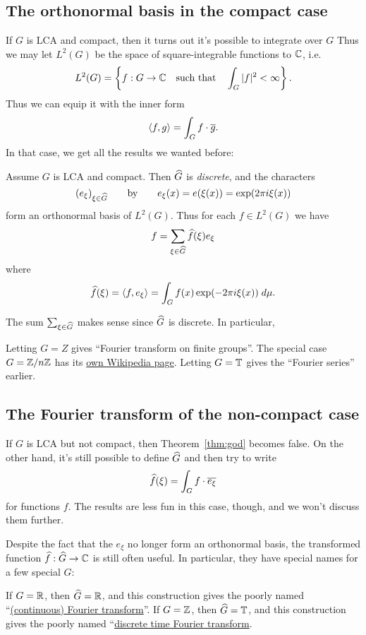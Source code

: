 \subsection{The orthonormal basis in the compact case}
If $G$ is LCA and compact,
then it turns out it's possible to integrate over $G$
Thus we may let $L^2(G)$ be the space of square-integrable functions to $\mathbb C$, i.e.
\[ L^2(G) = \left\{ f : G \to \mathbb C
	\quad\text{such that}\quad \int_G |f|^2 < \infty \right\}. \]
Thus we can equip it with the inner form
\[ \left< f,g \right> = \int_G f \cdot \overline{g}. \]
In that case, we get all the results we wanted before:
\begin{theorem}
	\label{thm:god}
	Assume $G$ is LCA and compact.
	Then $\widehat G$ is \emph{discrete}, and the characters
	\[ (e_\xi)_{\xi \in \widehat G}
		\qquad\text{by}\qquad e_\xi(x) = e(\xi(x)) = \exp(2\pi i \xi(x)) \]
	form an orthonormal basis of $L^2(G)$.
	Thus for each $f \in L^2(G)$ we have
	\[ f = \sum_{\xi \in \widehat G} \widehat f(\xi) e_\xi \]
	where
	\[ \widehat f(\xi) = \left< f, e_\xi \right>
		= \int_G f(x) \exp(-2\pi i \xi(x)) \; d\mu. \]
\end{theorem}
The sum $\sum_{\xi \in \widehat G}$ makes sense since $\widehat G$ is discrete.
In particular,
\begin{itemize}
	\ii Letting $G = Z$ gives ``Fourier transform on finite groups''.
	\ii The special case $G = \mathbb Z/n\mathbb Z$ has its
	\href{https://en.wikipedia.org/wiki/Discrete-time_Fourier_transform}%
	{own Wikipedia page}.
	\ii Letting $G = \mathbb T$ gives the ``Fourier series'' earlier.
\end{itemize}

\subsection{The Fourier transform of the non-compact case}
If $G$ is LCA but not compact, then Theorem~\ref{thm:god} becomes false.
On the other hand, it's still possible to define $\widehat G$
and then try to write
\[ \widehat f(\xi) = \int_G f \cdot \overline{e_\xi} \]
for functions $f$.
The results are less fun in this case,
though, and we won't discuss them further.

Despite the fact that the $e_\xi$ no longer form an orthonormal basis,
the transformed function $\widehat f : \widehat G \to \mathbb C$ is still often useful.
In particular, they have special names for a few special $G$:
\begin{itemize}
	\ii If $G = \mathbb R$, then $\widehat G = \mathbb R$,
	and this construction gives the poorly named
	``\href{https://en.wikipedia.org/wiki/Fourier_transform}{(continuous) Fourier transform}''.
	\ii If $G = \mathbb Z$, then $\widehat G = \mathbb T$,
	and this construction gives the poorly named
	``\href{https://en.wikipedia.org/wiki/Discrete-time_Fourier_transform}{discrete time Fourier transform}.
\end{itemize}

